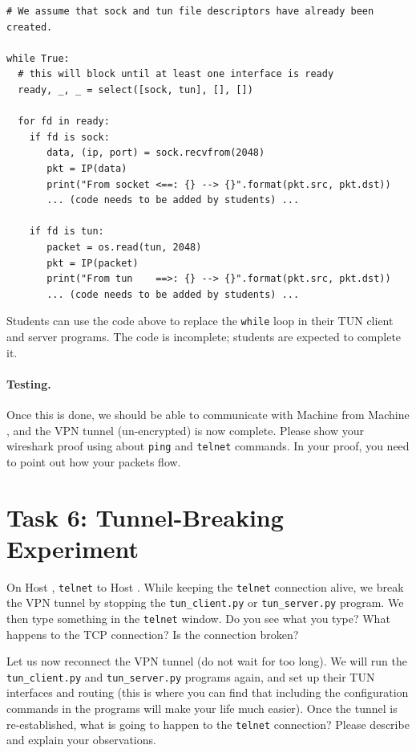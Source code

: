 \begin{lstlisting}
# We assume that sock and tun file descriptors have already been created.

while True:
  # this will block until at least one interface is ready
  ready, _, _ = select([sock, tun], [], [])

  for fd in ready:
    if fd is sock:
       data, (ip, port) = sock.recvfrom(2048)
       pkt = IP(data)
       print("From socket <==: {} --> {}".format(pkt.src, pkt.dst))
       ... (code needs to be added by students) ...

    if fd is tun:
       packet = os.read(tun, 2048)
       pkt = IP(packet)
       print("From tun    ==>: {} --> {}".format(pkt.src, pkt.dst))
       ... (code needs to be added by students) ...
\end{lstlisting}
 
Students can use the code above to replace the \texttt{while} loop
in their TUN client and server programs. The code is incomplete; students
are expected to complete it. 


\paragraph{Testing.} 
Once this is done, we should be able to communicate with Machine \hostv
from Machine \hostu, and the VPN tunnel (un-encrypted) is now complete. 
Please show your wireshark proof using about \texttt{ping} and
\texttt{telnet} commands. In your proof, you need to point out how your 
packets flow.



\section{Task 6:  Tunnel-Breaking Experiment}


On Host \hostu, \texttt{telnet} to Host \hostv. While keeping the
\texttt{telnet} connection alive, we break the VPN tunnel by stopping 
the \texttt{tun\_client.py} or \texttt{tun\_server.py} program.  
We then type something
in the \texttt{telnet} window. Do you see what you type? 
What happens to the TCP connection? Is the connection broken? 


Let us now reconnect the VPN tunnel (do not wait for too long). We will run the 
\texttt{tun\_client.py} and \texttt{tun\_server.py} programs again, and 
set up their TUN interfaces and routing (this is where 
you can find that including the configuration commands in the programs will
make your life much easier). Once the tunnel is re-established,
what is going to happen to the
\texttt{telnet} connection?  Please describe and explain your observations.




